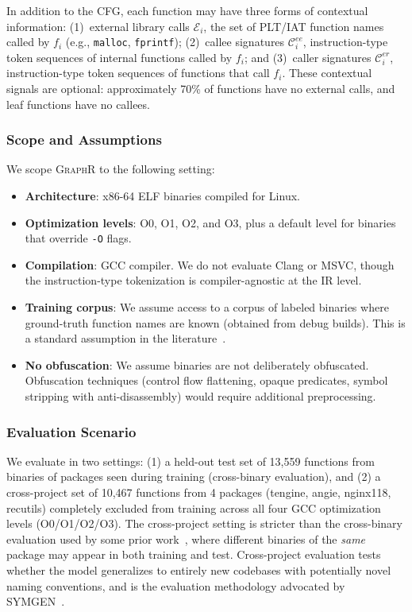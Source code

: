 \documentclass[sigconf,nonacm]{acmart}
\newcommand{\sysname}{\textsc{GraphR}}
\begin{document}
In addition to the CFG, each function may have three forms of contextual information: (1)~external library calls $\mathcal{E}_i$, the set of PLT/IAT function names called by $f_i$ (e.g., \texttt{malloc}, \texttt{fprintf}); (2)~callee signatures $\mathcal{C}_i^{ee}$, instruction-type token sequences of internal functions called by $f_i$; and (3)~caller signatures $\mathcal{C}_i^{er}$, instruction-type token sequences of functions that call $f_i$. These contextual signals are optional: approximately 70\% of functions have no external calls, and leaf functions have no callees.

\subsubsection{Scope and Assumptions}

We scope \sysname{} to the following setting:

\begin{itemize}
    \item \textbf{Architecture}: x86-64 ELF binaries compiled for Linux.
    \item \textbf{Optimization levels}: O0, O1, O2, and O3, plus a default level for binaries that override \texttt{-O} flags.
    \item \textbf{Compilation}: GCC compiler. We do not evaluate Clang or MSVC, though the instruction-type tokenization is compiler-agnostic at the IR level.
    \item \textbf{Training corpus}: We assume access to a corpus of labeled binaries where ground-truth function names are known (obtained from debug builds). This is a standard assumption in the literature~\cite{debin,nero,symlm,blens,symgen}.
    \item \textbf{No obfuscation}: We assume binaries are not deliberately obfuscated. Obfuscation techniques (control flow flattening, opaque predicates, symbol stripping with anti-disassembly) would require additional preprocessing.
\end{itemize}

\subsubsection{Evaluation Scenario}

We evaluate in two settings: (1) a held-out test set of 13{,}559 functions from binaries of packages seen during training (cross-binary evaluation), and (2) a cross-project set of 10{,}467 functions from 4 packages (tengine, angie, nginx118, recutils) completely excluded from training across all four GCC optimization levels (O0/O1/O2/O3). The cross-project setting is stricter than the cross-binary evaluation used by some prior work~\cite{nero,symlm}, where different binaries of the \emph{same} package may appear in both training and test. Cross-project evaluation tests whether the model generalizes to entirely new codebases with potentially novel naming conventions, and is the evaluation methodology advocated by SYMGEN~\cite{symgen}.
\end{document}
